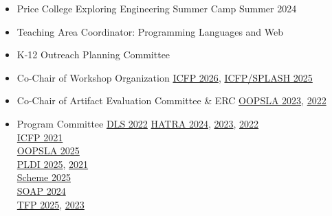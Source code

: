 \documentclass[11pt]{article}
\begin{document}

\begin{itemize}
  \item Price College Exploring Engineering Summer Camp \hfill Summer 2024
  \item {Teaching Area Coordinator: Programming Languages and Web} \hfill {}
  \item {K-12 Outreach Planning Committee} \hfill {}
\end{itemize}



\begin{itemize}
  \item {Co-Chair of Workshop Organization} \hfill \href{}{ICFP 2026}, \href{https://conf.researchr.org/committee/icfp-splash-2025/icfp-splash-2025-organizing-committee}{ICFP/SPLASH 2025}
  \item {Co-Chair of Artifact Evaluation Committee \& ERC} \hfill \href{https://2023.splashcon.org}{OOPSLA 2023}, \href{https://2022.splashcon.org}{2022}
  \item {Program Committee}
          \hfill \href{https://2022.splashcon.org/track/dls-2022-papers}{DLS 2022}
   \hbox{}\hfill \href{https://2024.splashcon.org/home/hatra-2024}{HATRA 2024}, \href{https://2023.splashcon.org/home/hatra-2023}{2023}, \href{https://2022.splashcon.org/home/hatra-2022}{2022} \\
   \hbox{}\hfill \href{https://icfp21.sigplan.org/committee/icfp-2021-papers-program-committee}{ICFP 2021} \\
   \hbox{}\hfill \href{https://2025.splashcon.org/committee/splash-2025-OOPSLA-oopsla-review-committee}{OOPSLA 2025} \\
   \hbox{}\hfill \href{https://pldi25.sigplan.org/committee/pldi-2025-papers-pldi-review-committee}{PLDI 2025}, \href{https://pldi21.sigplan.org/committee/pldi-2021-papers-program-committee}{2021} \\
   \hbox{}\hfill \href{}{Scheme 2025} \\
   \hbox{}\hfill \href{https://pldi24.sigplan.org/home/SOAP-2024}{SOAP 2024} \\
   \hbox{}\hfill \href{https://trendsfp.github.io/}{TFP 2025}, \href{https://trendsfp.github.io/2023/}{2023}


\end{itemize}
\end{document}
